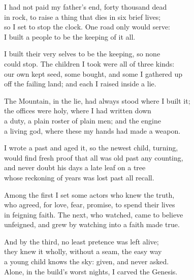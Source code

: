 \begin{founder}
I had not paid my father's end, forty thousand dead\\
in rock, to raise a thing that dies in six brief lives;\\
so I set to stop the clock. One road only would serve:\\
I built a people to be the keeping of it all.\\
\medskip

I built their very selves to be the keeping, so none\\
could stop. The children I took were all of three kinds:\\
our own kept seed, some bought, and some I gathered up\\
off the failing land; and each I raised inside a lie.\\
\medskip

The Mountain, in the lie, had always stood where I built it;\\
the offices were holy, where I had written down\\
a duty, a plain roster of plain men; and the engine\\
a living god, where these my hands had made a weapon.\\
\medskip

I wrote a past and aged it, so the newest child, turning,\\
would find fresh proof that all was old past any counting,\\
and never doubt his days a late leaf on a tree\\
whose reckoning of years was lost past all recall.\\
\medskip

Among the first I set some actors who knew the truth,\\
who agreed, for love, fear, promise, to spend their lives\\
in feigning faith. The next, who watched, came to believe\\
unfeigned, and grew by watching into a faith made true.\\
\medskip

And by the third, no least pretence was left alive;\\
they knew it wholly, without a seam, the easy way\\
a young child knows the sky: given, and never asked.\\
Alone, in the build's worst nights, I carved the Genesis.\\
\medskip


\end{founder}
